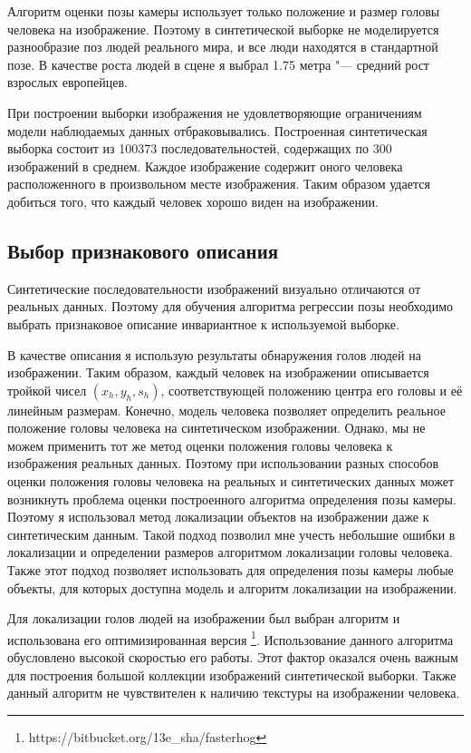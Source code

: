 Алгоритм оценки позы камеры использует только положение и размер головы человека на изображение. Поэтому в синтетической выборке не моделируется разнообразие поз людей реального мира, и все люди находятся в стандартной позе. В качестве роста людей в сцене я выбрал 1.75 метра "--- средний рост взрослых европейцев.

При построении выборки изображения не удовлетворяющие ограничениям модели наблюдаемых данных отбраковывались. Построенная синтетическая выборка состоит из 100373 последовательностей, содержащих по 300 изображений в среднем. Каждое изображение содержит оного человека расположенного в произвольном месте изображения. Таким образом удается добиться того, что каждый человек хорошо виден на изображении.

\subsection{Выбор признакового описания}

Синтетические последовательности изображений визуально отличаются от реальных данных. Поэтому для обучения алгоритма регрессии позы необходимо выбрать признаковое описание инвариантное к используемой выборке.

В качестве описания я использую результаты обнаружения голов людей на изображении. Таким образом, каждый человек на изображении описывается тройкой чисел $\left(x_h, y_h, s_h\right)$, соответствующей положению центра его головы и её линейным размерам. Конечно, модель человека \cite{pishchulin15arxiv} позволяет определить реальное положение головы человека на синтетическом изображении. Однако, мы не можем применить тот же метод оценки положения головы человека к изображения реальных данных. Поэтому при использовании разных способов оценки положения головы человека на реальных и синтетических данных может возникнуть проблема оценки построенного алгоритма определения позы камеры. Поэтому я использовал метод локализации объектов на изображении даже к синтетическим данным. Такой подход позволил мне учесть небольшие ошибки в локализации и определении размеров алгоритмом локализации головы человека. Также этот подход позволяет использовать для определения позы камеры любые объекты, для которых доступна модель и алгоритм локализации на изображении.

Для локализации голов людей на изображении был выбран алгоритм \cite{prisacariu_reid_tr2310_09} и использована его оптимизированная версия \footnote{https://bitbucket.org/13e\_sha/fasterhog}. Использование данного алгоритма обусловлено высокой скоростью его работы. Этот фактор оказался очень важным для построения большой коллекции изображений синтетической выборки. Также данный алгоритм не чувствителен к наличию текстуры на изображении человека.


